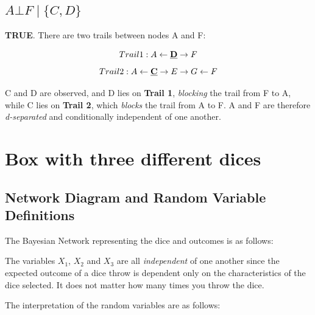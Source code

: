 \documentclass[12pt, letterpaper]{article}
\begin{document}
\subsection{\(A\bot F\mid \{C,D\}\)}
\textbf{TRUE}. There are two trails between nodes A and F:

\[Trail 1: A \leftarrow \textbf{\underline{D}} \rightarrow F\]
\[Trail 2: A \leftarrow \textbf{\underline{C}} \rightarrow E \rightarrow G \leftarrow F\]

C and D are observed, and D lies on \textbf{Trail 1}, \textit{blocking} the trail from F to A, while C lies on \textbf{Trail 2}, which \textit{blocks} the trail from A to F. A and F are therefore \textit{d-separated} and conditionally independent of one another.

\clearpage

\section{Box with three different dices}

\subsection{Network Diagram and Random Variable Definitions}

The Bayesian Network representing the dice and outcomes is as follows:\par

\begin{center}
\end{center}

The variables $X_1$, $X_2$ and $X_3$ are all \textit{independent} of one another since the expected outcome of a dice throw is dependent only on the characteristics of the dice selected. It does not matter how many times you throw the dice.

The interpretation of the random variables are as follows:
\end{document}
